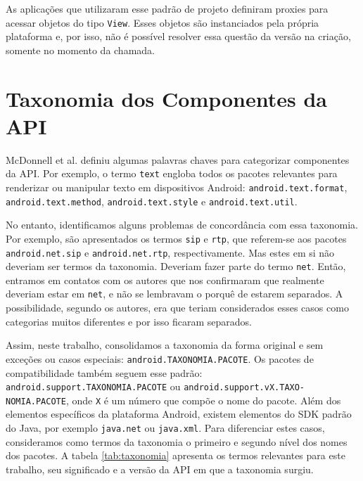 As aplicações que utilizaram esse padrão de projeto definiram proxies para acessar
objetos do tipo \texttt{View}. Esses objetos são instanciados pela própria plataforma
e, por isso, não é possível resolver essa questão da versão na criação, somente no
momento da chamada. 


\section{Taxonomia dos Componentes da API}
\label{sec:taxonomia}

McDonnell et al. \cite{McDonnell2013} definiu algumas palavras chaves para
categorizar componentes da API. Por exemplo, o termo \texttt{text} engloba todos
os pacotes relevantes para renderizar ou manipular texto em dispositivos Android:
\texttt{android.text.format}, \texttt{android.text.method}, \texttt{android.text.style}
e \texttt{android.text.util}.

No entanto, identificamos alguns problemas de concordância com essa taxonomia.
Por exemplo, são apresentados os termos \texttt{sip} e \texttt{rtp}, que referem-se
aos pacotes \texttt{android.net.sip} e \texttt{android.net.rtp}, respectivamente.
Mas estes em si não deveriam ser termos da taxonomia. Deveriam fazer parte do termo
\texttt{net}. Então, entramos em contatos com os autores que nos confirmaram que
realmente deveriam estar em \texttt{net}, e não se lembravam o porquê de estarem
separados. A possibilidade, segundo os autores, era que teriam considerados esses
casos como categorias muitos diferentes e por isso ficaram separados.

Assim, neste trabalho, consolidamos a taxonomia da forma original e sem exceções
ou casos especiais: \texttt{android.TAXONOMIA.PACOTE}. Os pacotes de compatibilidade
também seguem esse padrão: \texttt{android.support.TAXONOMIA.PACOTE} ou
\texttt{android.support.vX.TAXO- NOMIA.PACOTE}, %
onde \texttt{X} é um número que compõe
o nome do pacote. Além dos elementos específicos da plataforma Android, existem
elementos do SDK padrão do Java, por exemplo \texttt{java.net} ou \texttt{java.xml}.
Para diferenciar estes casos, consideramos como termos da taxonomia o primeiro e
segundo nível dos nomes dos pacotes.  A tabela \ref{tab:taxonomia} apresenta os
termos relevantes para este trabalho, seu significado e a versão da API em que a
taxonomia surgiu.



